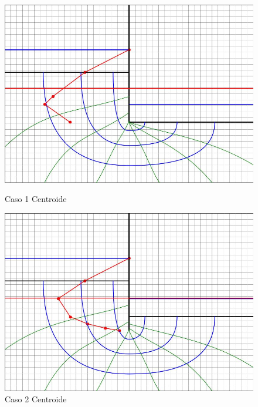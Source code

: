 \begin{figure}[H]
    \centering
    \begin{minipage}{0.32\textwidth}
        \centering
        \includegraphics[width=\textwidth]{GRAFICOS/caso_1_centroide_y.jpg}
        \caption{Caso 1 Centroide}
        \label{fig:caso_1_centroide_y}
    \end{minipage}
    \begin{minipage}{0.32\textwidth}
        \centering
        \includegraphics[width=\textwidth]{GRAFICOS/caso_2_centroide_y.jpg}
        \caption{Caso 2 Centroide}
        \label{fig:caso_2_centroide_y}
    \end{minipage}
    \begin{minipage}{0.32\textwidth}
        \centering

\end{minipage}
\end{figure}

